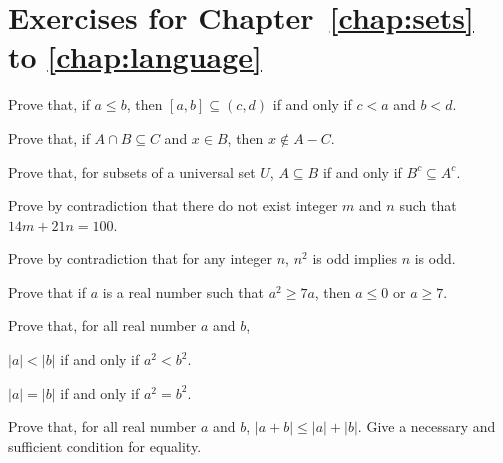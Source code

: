 \section{Exercises for Chapter~\ref{chap:sets} to \ref{chap:language}}

\begin{hw}
Prove that, if $a\leq b$, then $[a,b]\subseteq (c,d)$ if and only if $c<a$ and $b<d$.
\end{hw}

\begin{hw}
Prove that, if $A\cap B \subseteq C$ and $x\in B$, then $x\not\in A-C$.
\end{hw}

\begin{hw}
Prove that, for subsets of a universal set $U$, $A\subseteq B$ if and only if $B^c\subseteq A^c$.
\end{hw}

\begin{hw}
Prove by contradiction that there do not exist integer $m$ and $n$ such that $14m+21n=100$.
\end{hw}

\begin{hw}
Prove by contradiction that for any integer $n$, $n^2$ is odd implies $n$ is odd.
\end{hw}

\begin{hw}
Prove that if $a$ is a real number such that $a^2\geq 7a$, then $a\leq 0$ or $a\geq 7$.
\end{hw}

\begin{hw}
Prove that, for all real number $a$ and $b$,
\begin{myEnum}
\item $|a|<|b|$ if and only if $a^2<b^2$.
\item $|a|=|b|$ if and only if $a^2=b^2$.
\end{myEnum}
\end{hw}

\begin{hw}
Prove that, for all real number $a$ and $b$, $|a+b|\leq |a|+|b|$.
Give a necessary and sufficient condition for equality.
\end{hw}


